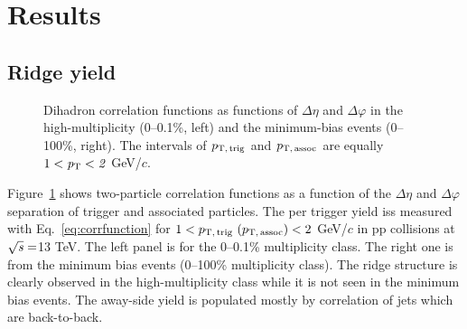 
\section {Results}
\label{sec:results}

\subsection{Ridge yield}

\begin{figure}[h!]
	\centering
	\caption{ Dihadron correlation functions as functions of $\Delta\eta$ and $\Delta\varphi$ in the high-multiplicity (0--0.1\%, left) and the minimum-bias events (0--100\%, right). The intervals of $p_\mathrm{T,\,trig}$ and $p_\mathrm{T,\,assoc}$ are equally $1 < \it{p}_{\rm{T}} < 2$ GeV/$c$. }
	\label{fig:PlotCorrMBHMT}
\end{figure}

Figure~\ref{fig:PlotCorrMBHMT} shows two-particle correlation functions as a function of the $\Delta \eta$ and $\Delta \varphi$ separation of trigger and associated particles. The per trigger yield iss measured with Eq.~\ref{eq:corrfunction} for $1 < p_\mathrm{T,\,trig}~\mathrm (p_\mathrm{T,\,assoc}) < 2$ GeV/$c$ in pp collisions at $\sqrt{\it{s}} = $\unit{13} {\rm{}TeV}. The left panel is for the 0--0.1\% multiplicity class. The right one is from the minimum bias events (0--100\% multiplicity class). The ridge structure is clearly observed in the high-multiplicity class while it is not seen in the minimum bias events. The away-side yield is populated mostly by correlation of jets which are back-to-back.

